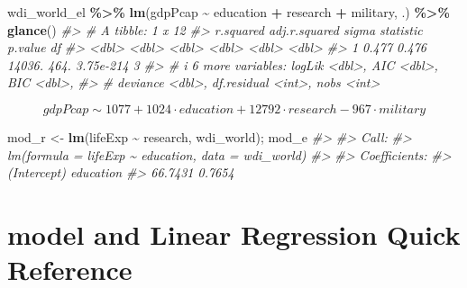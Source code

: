 \documentclass[
  xelatex, ja=standard]{bxjsbook}
\newenvironment{Shaded}{\begin{snugshade}}{\end{snugshade}}
\newcommand{\CommentTok}[1]{\textcolor[rgb]{0.56,0.35,0.01}{\textit{#1}}}
\newcommand{\FunctionTok}[1]{\textcolor[rgb]{0.13,0.29,0.53}{\textbf{#1}}}
\newcommand{\NormalTok}[1]{#1}
\newcommand{\OtherTok}[1]{\textcolor[rgb]{0.56,0.35,0.01}{#1}}
\newcommand{\SpecialCharTok}[1]{\textcolor[rgb]{0.81,0.36,0.00}{\textbf{#1}}}
\theoremstyle{definition}
\theoremstyle{definition}
\theoremstyle{definition}
\theoremstyle{definition}
\theoremstyle{remark}
\begin{document}
\begin{Shaded}
\begin{Highlighting}[]
\NormalTok{wdi\_world\_el }\SpecialCharTok{\%\textgreater{}\%} \FunctionTok{lm}\NormalTok{(gdpPcap }\SpecialCharTok{\textasciitilde{}}\NormalTok{ education }\SpecialCharTok{+}\NormalTok{ research }\SpecialCharTok{+}\NormalTok{ military, .) }\SpecialCharTok{\%\textgreater{}\%} \FunctionTok{glance}\NormalTok{()}
\CommentTok{\#\textgreater{} \# A tibble: 1 x 12}
\CommentTok{\#\textgreater{}   r.squared adj.r.squared  sigma statistic   p.value    df}
\CommentTok{\#\textgreater{}       \textless{}dbl\textgreater{}         \textless{}dbl\textgreater{}  \textless{}dbl\textgreater{}     \textless{}dbl\textgreater{}     \textless{}dbl\textgreater{} \textless{}dbl\textgreater{}}
\CommentTok{\#\textgreater{} 1     0.477         0.476 14036.      464. 3.75e{-}214     3}
\CommentTok{\#\textgreater{} \# i 6 more variables: logLik \textless{}dbl\textgreater{}, AIC \textless{}dbl\textgreater{}, BIC \textless{}dbl\textgreater{},}
\CommentTok{\#\textgreater{} \#   deviance \textless{}dbl\textgreater{}, df.residual \textless{}int\textgreater{}, nobs \textless{}int\textgreater{}}
\end{Highlighting}
\end{Shaded}

\[gdpPcap \sim 1077 + 1024\cdot education + 12792 \cdot research - 967 \cdot military\]

\begin{Shaded}
\begin{Highlighting}[]
\NormalTok{mod\_r }\OtherTok{\textless{}{-}} \FunctionTok{lm}\NormalTok{(lifeExp }\SpecialCharTok{\textasciitilde{}}\NormalTok{ research, wdi\_world); mod\_e}
\CommentTok{\#\textgreater{} }
\CommentTok{\#\textgreater{} Call:}
\CommentTok{\#\textgreater{} lm(formula = lifeExp \textasciitilde{} education, data = wdi\_world)}
\CommentTok{\#\textgreater{} }
\CommentTok{\#\textgreater{} Coefficients:}
\CommentTok{\#\textgreater{} (Intercept)    education  }
\CommentTok{\#\textgreater{}     66.7431       0.7654}
\end{Highlighting}
\end{Shaded}

\hypertarget{model-and-linear-regression-quick-reference}{%
\section{model and Linear Regression Quick Reference}\label{model-and-linear-regression-quick-reference}}
\end{document}

